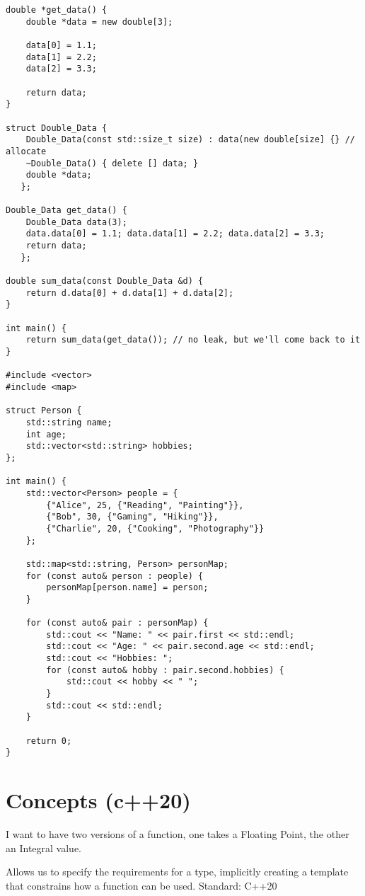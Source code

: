 \begin{verbatim}
double *get_data() {
    double *data = new double[3];

    data[0] = 1.1;
    data[1] = 2.2;
    data[2] = 3.3;

    return data;
}

struct Double_Data {
    Double_Data(const std::size_t size) : data(new double[size] {} // allocate
    ~Double_Data() { delete [] data; }
    double *data;
   };

Double_Data get_data() {
    Double_Data data(3);
    data.data[0] = 1.1; data.data[1] = 2.2; data.data[2] = 3.3;
    return data;
   };

double sum_data(const Double_Data &d) {
    return d.data[0] + d.data[1] + d.data[2];
}

int main() {
    return sum_data(get_data()); // no leak, but we'll come back to it
}

#include <vector>
#include <map>

struct Person {
    std::string name;
    int age;
    std::vector<std::string> hobbies;
};

int main() {
    std::vector<Person> people = {
        {"Alice", 25, {"Reading", "Painting"}},
        {"Bob", 30, {"Gaming", "Hiking"}},
        {"Charlie", 20, {"Cooking", "Photography"}}
    };

    std::map<std::string, Person> personMap;
    for (const auto& person : people) {
        personMap[person.name] = person;
    }

    for (const auto& pair : personMap) {
        std::cout << "Name: " << pair.first << std::endl;
        std::cout << "Age: " << pair.second.age << std::endl;
        std::cout << "Hobbies: ";
        for (const auto& hobby : pair.second.hobbies) {
            std::cout << hobby << " ";
        }
        std::cout << std::endl;
    }

    return 0;
}
\end{verbatim}


\section{Concepts (c++20)}

I want to have two versions of a function, one takes a Floating Point, the other an Integral value.

Allows us to specify the requirements for a type, implicitly creating a template
that constrains how a function can be used. Standard: C++20

